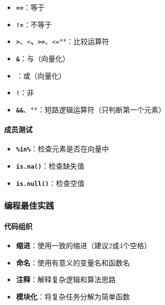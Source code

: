 \documentclass[
]{book}
\providecommand{\tightlist}{%
  \setlength{\itemsep}{0pt}\setlength{\parskip}{0pt}}
\begin{document}
\begin{itemize}
\tightlist
\item
  \textbf{\texttt{==}}：等于
\item
  \textbf{\texttt{!=}}：不等于
\item
  \textbf{\texttt{\textgreater{}}}、\texttt{\textless{}}\textbf{、\texttt{\textgreater{}=}}、\texttt{\textless{}=}**：比较运算符
\item
  \textbf{\texttt{\&}}：与（向量化）
\item
  \textbf{\texttt{\textbar{}}}：或（向量化）
\item
  \textbf{\texttt{!}}：非
\item
  \textbf{\texttt{\&\&}}、\texttt{\textbar{}\textbar{}}**：短路逻辑运算符（只判断第一个元素）
\end{itemize}

\hypertarget{ux6210ux5458ux6d4bux8bd5}{%
\paragraph{成员测试}\label{ux6210ux5458ux6d4bux8bd5}}

\begin{itemize}
\tightlist
\item
  \textbf{\texttt{\%in\%}}：检查元素是否在向量中
\item
  \textbf{\texttt{is.na()}}：检查缺失值
\item
  \textbf{\texttt{is.null()}}：检查空值
\end{itemize}

\hypertarget{ux7f16ux7a0bux6700ux4f73ux5b9eux8df5}{%
\subsubsection{编程最佳实践}\label{ux7f16ux7a0bux6700ux4f73ux5b9eux8df5}}

\hypertarget{ux4ee3ux7801ux7ec4ux7ec7}{%
\paragraph{代码组织}\label{ux4ee3ux7801ux7ec4ux7ec7}}

\begin{itemize}
\tightlist
\item
  \textbf{缩进}：使用一致的缩进（建议2或4个空格）
\item
  \textbf{命名}：使用有意义的变量名和函数名
\item
  \textbf{注释}：解释复杂逻辑和算法思路
\item
  \textbf{模块化}：将复杂任务分解为简单函数
\end{itemize}
\end{document}
